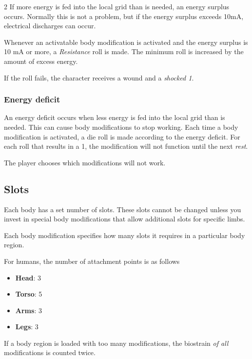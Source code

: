 \begin{multicols}{2}
If more energy is fed into the local grid than is needed, an energy surplus occurs. Normally this is not a problem, but if the energy surplus exceeds 10mA, electrical discharges can occur.

Whenever an activatable body modification is activated and the energy surplus is 10 mA or more, a \textit{Resistance} roll is made. The minimum roll is increased by the amount of excess energy.

If the roll fails, the character receives a wound and a \textit{shocked 1}.

\subsubsection{Energy deficit}

An energy deficit occurs when less energy is fed into the local grid than is needed. This can cause body modifications to stop working. Each time a body modification is activated, a die roll is made according to the energy deficit. For each roll that results in a 1, the modification will not function until the next \textit{rest}.

The player chooses which modifications will not work.

\subsection{Slots}

Each body has a set number of slots. These slots cannot be changed unless you invest in special body modifications that allow additional slots for specific limbs.

Each body modification specifies how many slots it requires in a particular body region.

For humans, the number of attachment points is as follows
\begin{itemize}
    \item \textbf{Head}: 3
    \item \textbf{Torso}: 5
    \item \textbf{Arms}: 3
    \item \textbf{Legs}: 3
\end{itemize}

If a body region is loaded with too many modifications, the biostrain \textit{of all} modifications is counted twice.


\end{multicols}
